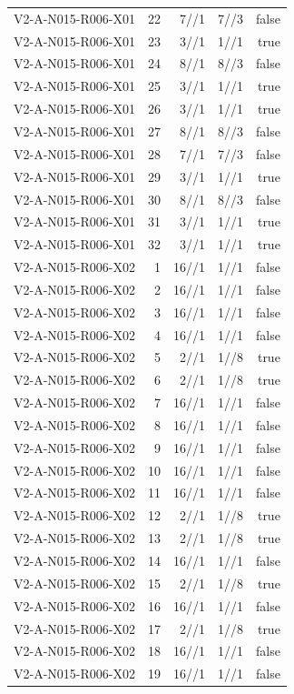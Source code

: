 {\begin{longtable}{lrrrr}
V2-A-N015-R006-X01 & 22 & 7//1 & 7//3 & false \\
V2-A-N015-R006-X01 & 23 & 3//1 & 1//1 & true \\
V2-A-N015-R006-X01 & 24 & 8//1 & 8//3 & false \\
V2-A-N015-R006-X01 & 25 & 3//1 & 1//1 & true \\
V2-A-N015-R006-X01 & 26 & 3//1 & 1//1 & true \\
V2-A-N015-R006-X01 & 27 & 8//1 & 8//3 & false \\
V2-A-N015-R006-X01 & 28 & 7//1 & 7//3 & false \\
V2-A-N015-R006-X01 & 29 & 3//1 & 1//1 & true \\
V2-A-N015-R006-X01 & 30 & 8//1 & 8//3 & false \\
V2-A-N015-R006-X01 & 31 & 3//1 & 1//1 & true \\
V2-A-N015-R006-X01 & 32 & 3//1 & 1//1 & true \\
V2-A-N015-R006-X02 & 1 & 16//1 & 1//1 & false \\
V2-A-N015-R006-X02 & 2 & 16//1 & 1//1 & false \\
V2-A-N015-R006-X02 & 3 & 16//1 & 1//1 & false \\
V2-A-N015-R006-X02 & 4 & 16//1 & 1//1 & false \\
V2-A-N015-R006-X02 & 5 & 2//1 & 1//8 & true \\
V2-A-N015-R006-X02 & 6 & 2//1 & 1//8 & true \\
V2-A-N015-R006-X02 & 7 & 16//1 & 1//1 & false \\
V2-A-N015-R006-X02 & 8 & 16//1 & 1//1 & false \\
V2-A-N015-R006-X02 & 9 & 16//1 & 1//1 & false \\
V2-A-N015-R006-X02 & 10 & 16//1 & 1//1 & false \\
V2-A-N015-R006-X02 & 11 & 16//1 & 1//1 & false \\
V2-A-N015-R006-X02 & 12 & 2//1 & 1//8 & true \\
V2-A-N015-R006-X02 & 13 & 2//1 & 1//8 & true \\
V2-A-N015-R006-X02 & 14 & 16//1 & 1//1 & false \\
V2-A-N015-R006-X02 & 15 & 2//1 & 1//8 & true \\
V2-A-N015-R006-X02 & 16 & 16//1 & 1//1 & false \\
V2-A-N015-R006-X02 & 17 & 2//1 & 1//8 & true \\
V2-A-N015-R006-X02 & 18 & 16//1 & 1//1 & false \\
V2-A-N015-R006-X02 & 19 & 16//1 & 1//1 & false \\

\end{longtable}}
